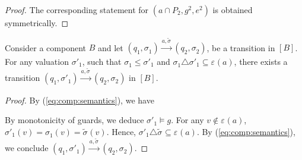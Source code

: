 \documentclass{llncs}
\newcommand{\eq}[1]{(\ref{eq:#1})}
\newcommand{\goesto}[2][]{\ensuremath{\xrightarrow[#1]{#2}}}
\newcommand{\val}[3][]{\ensuremath{#1{\sigma}^{#2}_{#3}}}
\newcommand{\primeit}[1]{#1'}
\newcommand{\export}[1][]{\ensuremath{\varepsilon_{#1}}}
\newcommand{\valdiff}[2]{\ensuremath{#1 \triangle #2}}
\newcommand{\semopen}[1]{\ensuremath{[{#1}]}}
\newcommand{\order}{\leqslant}
\begin{document}
\begin{proof}
  The corresponding statement for $(a \cap P_2, g^2, e^2)$ is obtained
  symmetrically.
\end{proof}

\begin{lemma}
  \label{lem:stepabove}
  Consider a component $B$ and let 
%
  $
  (q_1, \val{}{1})
%
  \goesto{a, \val[\tilde]{}{}}
%
  (q_2, \val{}{2})
  $,
%
  be a transition in $\semopen{B}$.  For any valuation
  $\val[\primeit]{}{1}$, such that
  $\val{}{1} \order \val[\primeit]{}{1}$ and
  $\valdiff{\val{}{1}}{\val[\primeit]{}{1}} \subseteq \export(a)$,
  there exists a transition
%
  $
  (q_1, \val[\primeit]{}{1})
%
  \goesto{a, \val[\tilde]{}{}}
%
  (q_2, \val{}{2})
  $
%
  in $\semopen{B}$.
\end{lemma}
%
\begin{proof}
  By \eq{comp:semantics}, we have
%

  By monotonicity of guards, we deduce
  $\val[\primeit]{}{1} \models g$.
  For any $v \not\in \export(a)$,
  $\val[\primeit]{}{1}(v) = \val{}{1}(v) = \val[\tilde]{}{}(v)$.
  Hence, 
  $\valdiff{\val[\primeit]{}{1}}{\val[\tilde]{}{}}
  \subseteq \export(a)$.
  By \eq{comp:semantics}, we conclude 
%
  $
  (q_1, \val[\primeit]{}{1})
%
  \goesto{a, \val[\tilde]{}{}}
%
  (q_2, \val{}{2})
  $.  
\end{proof}
\end{document}
